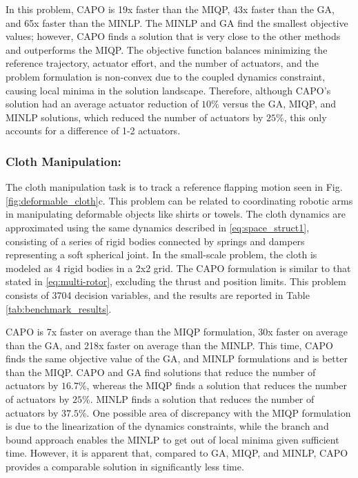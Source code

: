 In this problem, CAPO is 19x faster than the MIQP, 43x faster than the GA, and 65x faster than the MINLP. The MINLP and GA find the smallest objective values; however, CAPO finds a solution that is very close to the other methods and outperforms the MIQP. The objective function balances minimizing the reference trajectory, actuator effort, and the number of actuators, and the problem formulation is non-convex due to the coupled dynamics constraint, causing local minima in the solution landscape. Therefore, although CAPO's solution had an average actuator reduction of $10\%$ versus the GA, MIQP, and MINLP solutions, which reduced the number of actuators by $25\%$, this only accounts for a difference of 1-2 actuators.

\subsubsection{Cloth Manipulation:}
The cloth manipulation task is to track a reference flapping motion seen in Fig. \ref{fig:deformable_cloth}c. This problem can be related to coordinating robotic arms in manipulating deformable objects like shirts or towels. The cloth dynamics are approximated using the same dynamics described in \eqref{eq:space_struct1}, consisting of a series of rigid bodies connected by springs and dampers representing a soft spherical joint. In the small-scale problem, the cloth is modeled as 4 rigid bodies in a 2x2 grid. The CAPO formulation is similar to that stated in \eqref{eq:multi-rotor}, excluding the thrust and position limits. This problem consists of 3704 decision variables, and the results are reported in Table \ref{tab:benchmark_results}. 

CAPO is 7x faster on average than the MIQP formulation, 30x faster on average than the GA, and 218x faster on average than the MINLP. This time, CAPO finds the same objective value of the GA, and MINLP formulations and is better than the MIQP. CAPO and GA find solutions that reduce the number of actuators by $16.7\%$, whereas the MIQP finds a solution that reduces the number of actuators by $25\%$. MINLP finds a solution that reduces the number of actuators by $37.5\%$. One possible area of discrepancy with the MIQP formulation is due to the linearization of the dynamics constraints, while the branch and bound approach enables the MINLP to get out of local minima given sufficient time. However, it is apparent that, compared to GA, MIQP, and MINLP, CAPO provides a comparable solution in significantly less time.
